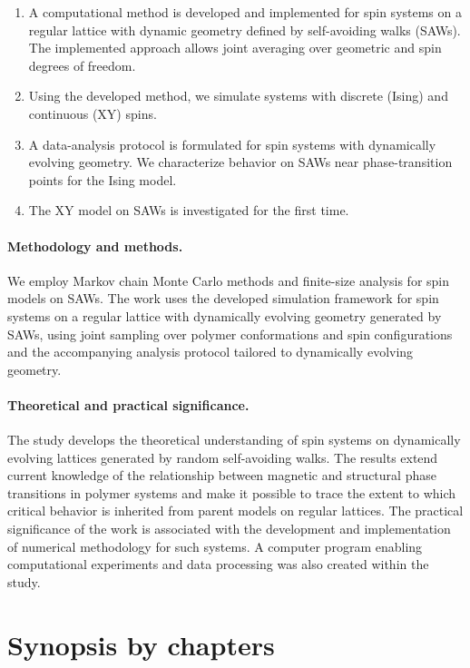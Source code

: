\begin{enumerate}
	\item A computational method is developed and implemented for spin systems on a regular lattice with dynamic geometry defined by self-avoiding walks (SAWs). The implemented approach allows joint averaging over geometric and spin degrees of freedom.
	\item Using the developed method, we simulate systems with discrete (Ising) and continuous (XY) spins.
	\item A data-analysis protocol is formulated for spin systems with dynamically evolving geometry. We characterize behavior on SAWs near phase-transition points for the Ising model.
	\item The XY model on SAWs is investigated for the first time.
\end{enumerate}


\paragraph*{Methodology and methods.}

We employ Markov chain Monte Carlo methods and finite-size analysis for spin models on SAWs. The work uses the developed simulation framework for spin systems on a regular lattice with dynamically evolving geometry generated by SAWs, using joint sampling over polymer conformations and spin configurations and the accompanying analysis protocol tailored to dynamically evolving geometry.


\paragraph*{Theoretical and practical significance.}



The study develops the theoretical understanding of spin systems on dynamically evolving lattices generated by random self-avoiding walks. The results extend current knowledge of the relationship between magnetic and structural phase transitions in polymer systems and make it possible to trace the extent to which critical behavior is inherited from parent models on regular lattices. The practical significance of the work is associated with the development and implementation of numerical methodology for such systems. A computer program enabling computational experiments and data processing was also created within the study.



\section*{Synopsis by chapters}

